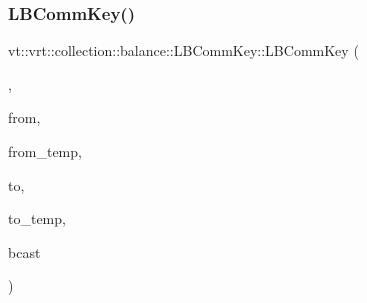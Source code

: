 \subsubsection{\texorpdfstring{L\+B\+Comm\+Key()}{LBCommKey()}\hspace{0.1cm}{\footnotesize\ttfamily [4/6]}}
{\footnotesize\ttfamily vt\+::vrt\+::collection\+::balance\+::\+L\+B\+Comm\+Key\+::\+L\+B\+Comm\+Key (\begin{DoxyParamCaption}\item[{\hyperlink{structvt_1_1vrt_1_1collection_1_1balance_1_1_l_b_comm_key_1_1_collection_tag}{Collection\+Tag}}]{,  }\item[{\hyperlink{namespacevt_1_1vrt_1_1collection_1_1balance_a14c8d2c972f2913aa3f1636e5be0a120}{Element\+I\+D\+Type}}]{from,  }\item[{\hyperlink{namespacevt_1_1vrt_1_1collection_1_1balance_a14c8d2c972f2913aa3f1636e5be0a120}{Element\+I\+D\+Type}}]{from\+\_\+temp,  }\item[{\hyperlink{namespacevt_1_1vrt_1_1collection_1_1balance_a14c8d2c972f2913aa3f1636e5be0a120}{Element\+I\+D\+Type}}]{to,  }\item[{\hyperlink{namespacevt_1_1vrt_1_1collection_1_1balance_a14c8d2c972f2913aa3f1636e5be0a120}{Element\+I\+D\+Type}}]{to\+\_\+temp,  }\item[{bool}]{bcast }\end{DoxyParamCaption})\hspace{0.3cm}{\ttfamily [inline]}}

\mbox{\label{structvt_1_1vrt_1_1collection_1_1balance_1_1_l_b_comm_key_a34c069e516c26566d41329816418b03a}} 
